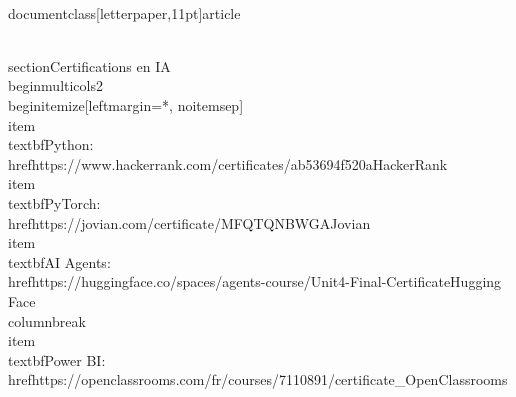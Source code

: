 \\documentclass[letterpaper,11pt]{article}
\begin{document}
\\section{Certifications en IA}
\\begin{multicols}{2}
\\begin{itemize}[leftmargin=*, noitemsep]
  \\item \\textbf{Python}: \\href{https://www.hackerrank.com/certificates/ab53694f520a}{HackerRank}
  \\item \\textbf{PyTorch}: \\href{https://jovian.com/certificate/MFQTQNBWGA}{Jovian}
  \\item \\textbf{AI Agents}: \\href{https://huggingface.co/spaces/agents-course/Unit4-Final-Certificate}{Hugging Face}
  \\columnbreak
  \\item \\textbf{Power BI}: \\href{https://openclassrooms.com/fr/courses/7110891/certificate_}{OpenClassrooms}
\end{document}
